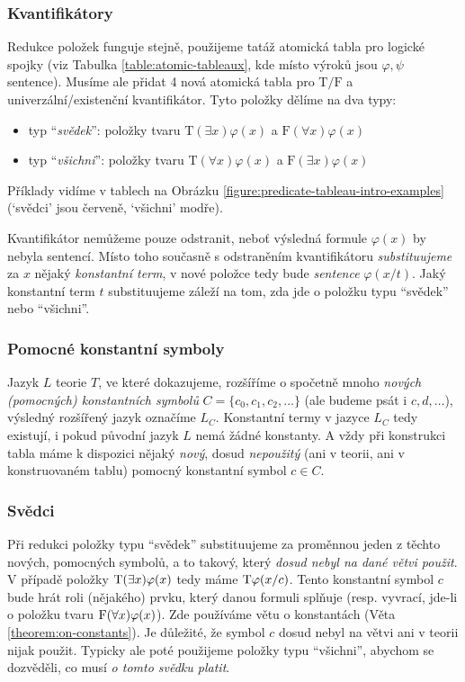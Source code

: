 \subsubsection{Kvantifikátory}
Redukce položek funguje stejně, použijeme tatáž atomická tabla pro logické spojky (viz Tabulka \ref{table:atomic-tableaux}, kde místo výroků jsou $\varphi,\psi$ sentence). Musíme ale přidat 4 nová atomická tabla pro $\mathrm T/\mathrm F$ a univerzální/existenční kvantifikátor. Tyto položky dělíme na dva typy:
\begin{itemize}
    \item typ ``\emph{svědek}'': položky tvaru $\mathrm{T}(\exists x)\varphi(x)$ a $\mathrm{F}(\forall x)\varphi(x)$
    \item typ ``\emph{všichni}'': položky tvaru $\mathrm{T}(\forall x)\varphi(x)$ a $\mathrm{F}(\exists x)\varphi(x)$    
\end{itemize}
Příklady vidíme v tablech na Obrázku \ref{figure:predicate-tableau-intro-examples} (`svědci' jsou červeně, `všichni' modře).

Kvantifikátor nemůžeme pouze odstranit, neboť výsledná formule $\varphi(x)$ by nebyla sentencí. Místo toho současně s odstraněním kvantifikátoru \emph{substituujeme} za $x$ nějaký \emph{konstantní term}, v nové položce tedy bude \emph{sentence} $\varphi(x/t)$. Jaký konstantní term $t$ substituujeme záleží na tom, zda jde o položku typu ``svědek'' nebo ``všichni''. 

\subsubsection{Pomocné konstantní symboly}
Jazyk $L$ teorie $T$, ve které dokazujeme, rozšíříme o spočetně mnoho \emph{nových (pomocných) konstantních symbolů} $C=\{c_0,c_1,c_2,\dots\}$ (ale budeme psát i $c,d,\dots$), výsledný rozšířený jazyk označíme $L_C$. Konstantní termy v jazyce $L_C$ tedy existují, i pokud původní jazyk $L$ nemá žádné konstanty. A vždy při konstrukci tabla máme k dispozici nějaký \emph{nový}, dosud \emph{nepoužitý} (ani v teorii, ani v konstruovaném tablu) pomocný konstantní symbol $c\in C$.

\subsubsection{Svědci}
Při redukci položky typu ``svědek'' substituujeme za proměnnou jeden z těchto nových, pomocných symbolů, a to takový, který \emph{dosud nebyl na dané větvi použit}. V případě položky $\mathrm{T}(\exists x)\varphi(x)$ tedy máme $\mathrm{T}\varphi(x/c)$. Tento konstantní symbol $c$ bude hrát roli (nějakého) prvku, který danou formuli splňuje (resp. vyvrací, jde-li o položku tvaru $\mathrm{F}(\forall x)\varphi(x)$). Zde používáme větu o konstantách (Věta \ref{theorem:on-constants}). Je důležité, že symbol $c$ dosud nebyl na větvi ani v teorii nijak použit. Typicky ale poté použijeme položky typu ``všichni'', abychom se dozvěděli, co musí \emph{o tomto svědku platit}.

